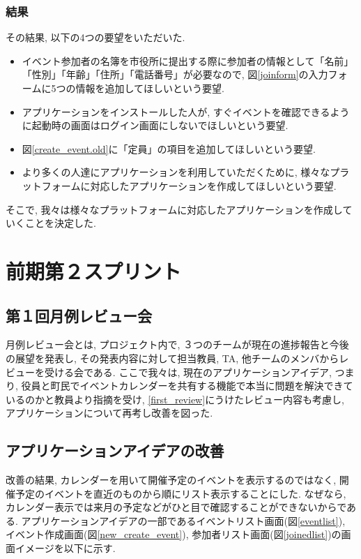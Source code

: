 \subsubsection{結果}
その結果, 以下の4つの要望をいただいた.
\begin{itemize}
    \item イベント参加者の名簿を市役所に提出する際に参加者の情報として「名前」「性別」「年齢」「住所」「電話番号」が必要なので, 図\ref{joinform}の入力フォームに5つの情報を追加してほしいという要望.
    \item アプリケーションをインストールした人が, すぐイベントを確認できるように起動時の画面はログイン画面にしないでほしいという要望.
    \item 図\ref{create_event.old}に「定員」の項目を追加してほしいという要望.
    \item より多くの人達にアプリケーションを利用していただくために, 様々なプラットフォームに対応したアプリケーションを作成してほしいという要望.
\end{itemize}
そこで, 我々は様々なプラットフォームに対応したアプリケーションを作成していくことを決定した.

\section{前期第２スプリント}

\subsection{第１回月例レビュー会}
月例レビュー会とは, プロジェクト内で, ３つのチームが現在の進捗報告と今後の展望を発表し, その発表内容に対して担当教員, TA, 他チームのメンバからレビューを受ける会である.
ここで我々は, 現在のアプリケーションアイデア, つまり, 役員と町民でイベントカレンダーを共有する機能で本当に問題を解決できているのかと教員より指摘を受け,
\ref{first_review}にうけたレビュー内容も考慮し, アプリケーションについて再考し改善を図った.


\subsection{アプリケーションアイデアの改善}
改善の結果, カレンダーを用いて開催予定のイベントを表示するのではなく,
開催予定のイベントを直近のものから順にリスト表示することにした.
なぜなら, カレンダー表示では来月の予定などがひと目で確認することができないからである.
アプリケーションアイデアの一部であるイベントリスト画面(図\ref{eventlist}),
イベント作成画面(図\ref{new_create_event}), 参加者リスト画面(図\ref{joinedlist})の画面イメージを以下に示す.

